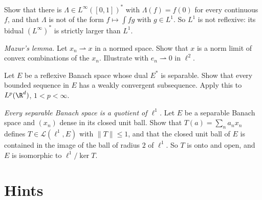 \begin{exercise}[$\star\star$]\label{ex:linftydual}
Show that there is $\Lambda\in L^\infty([0,1])^*$ with $\Lambda(f)=f(0)$ for every continuous $f$, and that $\Lambda$ is not of the form $f\mapsto\int fg$ with $g\in L^1$. So $L^1$ is not reflexive: its bidual $(L^\infty)^*$ is
strictly larger than $L^1$.
\end{exercise}

\begin{exercise}[$\star\star$]\label{ex:mazur}
\emph{Mazur's lemma.} Let $x_n\rightharpoonup x$ in a normed space. Show that $x$ is a norm limit of convex combinations of the $x_n$. Illustrate with $e_n\rightharpoonup0$ in $\ell^2$.
\end{exercise}

\begin{exercise}[$\star\star$]\label{ex:reflexiveweak}
Let $E$ be a reflexive Banach space whose dual $E^*$ is separable. Show that every bounded sequence in $E$ has a weakly convergent subsequence. Apply this to $L^p(\R^d)$, $1<p<\infty$.
\end{exercise}

\begin{exercise}[$\star\star\star$]\label{ex:l1quotient}
\emph{Every separable Banach space is a quotient of $\ell^1$.} Let $E$ be a separable Banach space and $(x_n)$ dense in its closed unit ball. Show that $T(a)=\sum_na_nx_n$ defines $T\in\mathcal L(\ell^1,E)$ with $\|T\|\le1$, and that
the closed unit ball of $E$ is contained in the image of the ball of radius $2$ of $\ell^1$. So $T$ is onto and open, and $E$ is isomorphic to $\ell^1/\ker T$.
\end{exercise}

\section{Hints}

